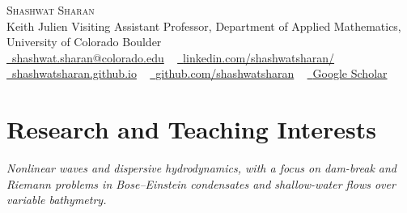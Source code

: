 \documentclass[letterpaper,10pt]{article} %
\begin{document}

\begin{center}
    {\Huge \scshape Shashwat Sharan} \\ \vspace{2pt}
    {\small Keith Julien Visiting Assistant Professor, Department of Applied Mathematics, University of Colorado Boulder} \\ \vspace{2pt}
    \footnotesize \href{mailto:shashwat.sharan@colorado.edu}{\raisebox{-0.2\height}\faEnvelope\  
    {shashwat.sharan@colorado.edu}} ~ 
    \href{https://linkedin.com/in//}{\raisebox{-0.2\height}\faLinkedin\ {linkedin.com/shashwatsharan/}}  ~
    \href{https://shashwatsharan.github.io/}{\raisebox{-0.2\height}\faGlobe\ {shashwatsharan.github.io}}  ~
    \href{https://github.com/shashwatsharan}{\raisebox{-0.2\height}\faGithub\ {github.com/shashwatsharan}}  ~
    \href{https://scholar.google.com/citations?user=fyJwJbwAAAAJ&hl=en}{\raisebox{-0.2\height}\faGraduationCap\ {Google Scholar}}
    \vspace{-8pt}
\end{center}

\vspace{1pt}


\section{\color{headcol} Research and Teaching Interests}
\vspace{2.8pt} %
\textit{Nonlinear waves and dispersive hydrodynamics, with a focus on dam-break and Riemann problems in Bose--Einstein condensates and shallow-water flows over variable bathymetry.}\\[3pt]
\end{document}
